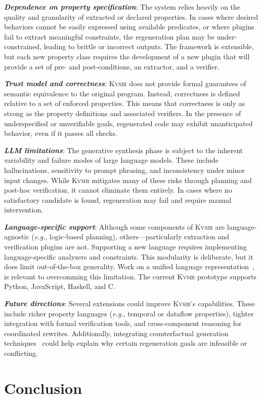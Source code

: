 \documentclass[sigplan]{acmart}
\def\eg{{\em e.g.}, }
\newcommand{\sys}{{\scshape Kv{\textalpha}sir}\xspace}
\newcommand{\heading}[1]{\vspace{2pt}\noindent\textbf{\emph{#1}}:\enspace}
\begin{document}
\heading{Dependence on property specification}
The system relies heavily on the quality and granularity of extracted or declared properties.
In cases where desired behaviors cannot be easily expressed using available predicates, or where plugins fail to extract meaningful constraints, the regeneration plan may be under-constrained, leading to brittle or incorrect outputs. The framework is extensible, but each new property class requires the development of a new plugin that will provide a set of pre- and post-conditions, an extractor, and a verifier.

\heading{Trust model and correctness}
\sys does not provide formal guarantees of semantic equivalence to the original program. Instead, correctness is defined relative to a set of enforced properties. This means that correctness is only as strong as the property definitions and associated verifiers.
In the presence of underspecified or unverifiable goals, regenerated code may exhibit unanticipated behavior, even if it passes all checks.

\heading{LLM limitations}
The generative synthesis phase is subject to the inherent variability and failure modes of large language models. These include hallucinations, sensitivity to prompt phrasing, and inconsistency under minor input changes. While \sys mitigates many of these risks through planning and post-hoc verification, it cannot eliminate them entirely.
In cases where no satisfactory candidate is found, regeneration may fail and require manual intervention.

\heading{Language-specific support}
Although some components of \sys are language-agnostic (\eg logic-based planning), others---particularly extraction and verification plugins are not.
Supporting a new language requires implementing language-specific analyzers and constraints. This modularity is deliberate, but it does limit out-of-the-box generality.
Work on a unified language representation~\cite{koppel2018onetool,bap2011,dillig2009sail}, is relevant to overcomming this limitation.
The current \sys prototype supports Python, JavaScript, Haskell, and C.

\heading{Future directions}
Several extensions could improve \sys's capabilities. These include richer property languages (\eg temporal or dataflow properties), tighter integration with formal verification tools, and cross-component reasoning for coordinated rewrites.
Additionally, integrating counterfactual generation techniques~\cite{Cabalar_2020} could help explain why certain regeneration goals are infeasible or conflicting.


\section{Conclusion}



\end{document}

